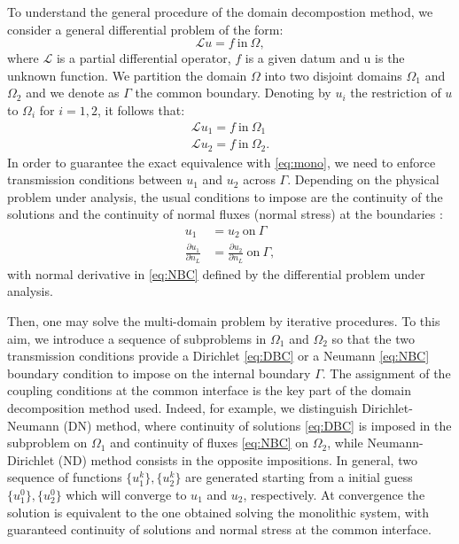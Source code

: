 To understand the general procedure of the domain decompostion method, we consider a general differential problem of the form:
\begin{equation} \label{eq:mono}
  \mathcal{L} u = f \ \text{in} \ \Omega,
\end{equation}
where $\mathcal{L}$ is a partial differential operator, $f$ is a given datum and u is the unknown function. We partition the domain $\Omega$ into two disjoint domains $\Omega_1$ and $\Omega_2$ and we denote as $\Gamma$ the common boundary. Denoting by $u_i$ the restriction of $u$ to $\Omega_i$ for $i = 1,2$, it follows that:
\begin{equation} \begin{aligned}
  \mathcal{L} u_1 = f \ \text{in} \ \Omega_1\\
  \mathcal{L} u_2 = f \ \text{in} \ \Omega_2 .
\end{aligned}\end{equation}
In order to guarantee the exact equivalence with \eqref{eq:mono}, we need to enforce transmission conditions between $u_1$ and $u_2$ across $\Gamma$. Depending on the physical problem under analysis, the usual conditions to impose are the continuity of the solutions and the continuity of normal fluxes (normal stress) at the boundaries \cite{DD:QuarteroniValli}: \begin{align}
  u_1 & = u_2 \ \text{on} \ \Gamma \label{eq:DBC}
  \\
  \frac{\partial u_1}{\partial n_L} & = \frac{\partial u_2}{\partial n_L} \ \text{on} \ \Gamma, \label{eq:NBC}
\end{align}
with normal derivative in \eqref{eq:NBC} defined by the differential problem under analysis.

Then, one may solve the multi-domain problem by iterative procedures. To this aim, we introduce a sequence of subproblems in $\Omega_1$ and $\Omega_2$ so that the two transmission conditions provide a Dirichlet \eqref{eq:DBC} or a Neumann \eqref{eq:NBC} boundary condition to impose on the internal boundary $\Gamma$. The assignment of the coupling conditions at the common interface is the key part of the domain decomposition method used. Indeed, for example, we distinguish Dirichlet-Neumann (DN) method, where continuity of solutions \eqref{eq:DBC} is imposed in the subproblem on $\Omega_1$ and continuity of fluxes \eqref{eq:NBC} on $\Omega_2$, while Neumann-Dirichlet (ND) method consists in the opposite impositions. In general, two sequence of functions $ \{u_1^k\}, \{u_2^k\}$ are generated starting from a initial guess $ \{u_1^0\}, \{u_2^0\}$ which will converge to $u_1$ and $u_2$, respectively. At convergence the solution is equivalent to the one obtained solving the monolithic system, with guaranteed continuity of solutions and normal stress at the common interface.

